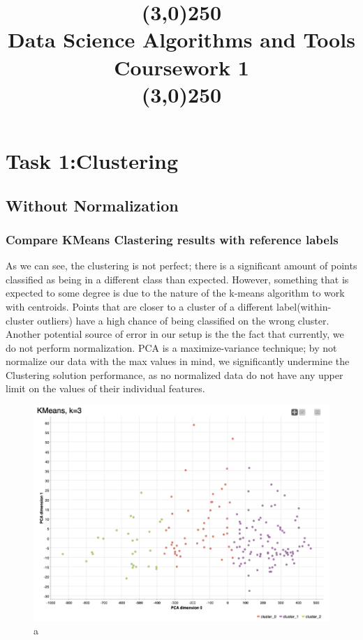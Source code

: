 \documentclass[openany]{book}
\title{\line(3,0){250}\\Data Science Algorithms and Tools \\ Coursework 1  \\\line(3,0){250}}
\begin{document}
	\maketitle
	\chapter{Task 1:Clustering}
		\section{Without Normalization}
			\subsection{Compare KMeans Clastering results with reference labels}
				As we can see, the clustering is not perfect; there is a significant amount of points classified as being in a different class than expected.
				However, something that is expected to some degree is due to the nature of the k-means algorithm to work with centroids. Points that are closer
				to a cluster of a different label(within-cluster outliers) have a high chance of being classified on the wrong cluster. Another potential source of error in our setup is the 
				the fact that currently, we do not perform normalization. PCA is a maximize-variance technique; by not normalize our data with 
				the max values in mind, we significantly undermine the Clustering solution performance, as no normalized data do not have any upper 
				limit on the values of their individual features.
				\begin{figure}[H]
					\iftrue
					\centering
					\caption{a}
					\includegraphics[scale=0.3]{res/task1.1.kmeans}
					\fi
				\end{figure}
\end{document}
